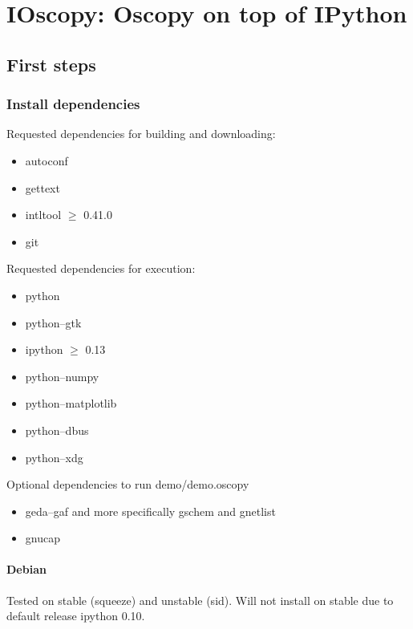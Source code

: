 \documentclass[a4paper,11pt]{report}
\begin{document}
\chapter{IOscopy: Oscopy on top of IPython}

\section{First steps}
\subsection{Install dependencies}
Requested dependencies for building and downloading:
\begin{itemize}
\item    autoconf
\item    gettext
\item    intltool $\ge$ 0.41.0
\item    git
\end{itemize}

Requested dependencies for execution:
\begin{itemize}
\item    python
\item    python--gtk
\item    ipython $\ge$ 0.13
\item    python--numpy
\item    python--matplotlib
\item    python--dbus
\item    python--xdg
\end{itemize}

Optional dependencies to run demo/demo.oscopy
\begin{itemize}
\item    geda--gaf and more specifically gschem and gnetlist
\item    gnucap
\end{itemize}

\subsubsection{Debian}
Tested on stable (squeeze) and unstable (sid). Will not install on stable due to default release ipython 0.10.
\end{document}
